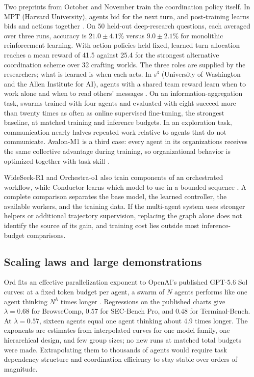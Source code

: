 Two preprints from October and November train the coordination policy itself. In MPT (Harvard University), agents bid for the next turn, and post-training learns bids and actions together \citep{mpt-self-orchestration}. On 50 held-out deep-research questions, each averaged over three runs, accuracy is $21.0\pm4.1\%$ versus $9.0\pm2.1\%$ for monolithic reinforcement learning. With action policies held fixed, learned turn allocation reaches a mean reward of 41.5 against 25.4 for the strongest alternative coordination scheme over 32 crafting worlds. The three roles are supplied by the researchers; what is learned is when each acts. In s$^3$ (University of Washington and the Allen Institute for AI), agents with a shared team reward learn when to work alone and when to read others' messages \citep{s3-swarm-scaling}. On an information-aggregation task, swarms trained with four agents and evaluated with eight succeed more than twenty times as often as online supervised fine-tuning, the strongest baseline, at matched training and inference budgets. In an exploration task, communication nearly halves repeated work relative to agents that do not communicate. Avalon-M1 is a third case: every agent in its organizations receives the same collective advantage during training, so organizational behavior is optimized together with task skill \citep{avalon-m1}.

WideSeek-R1 and Orchestra-o1 also train components of an orchestrated workflow, while Conductor learns which model to use in a bounded sequence \citep{wideseek-r1,orchestra-o1,sakana-conductor}. A complete comparison separates the base model, the learned controller, the available workers, and the training data. If the multi-agent system uses stronger helpers or additional trajectory supervision, replacing the graph alone does not identify the source of its gain, and training cost lies outside most inference-budget comparisons.

\subsection{Scaling laws and large demonstrations}
Ord fits an effective parallelization exponent to OpenAI's published GPT-5.6 Sol curves: at a fixed token budget per agent, a swarm of $N$ agents performs like one agent thinking $N^{\lambda}$ times longer \citep{ord-swarm-scaling}. Regressions on the published charts give $\lambda=0.68$ for BrowseComp, $0.57$ for SEC-Bench Pro, and $0.48$ for Terminal-Bench. At $\lambda=0.57$, sixteen agents equal one agent thinking about 4.9 times longer. The exponents are estimates from interpolated curves for one model family, one hierarchical design, and few group sizes; no new runs at matched total budgets were made. Extrapolating them to thousands of agents would require task dependency structure and coordination efficiency to stay stable over orders of magnitude.

